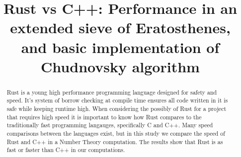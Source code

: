\documentclass[10pt]{IEEEtran}
\begin{document}
\title{Rust vs C++: Performance in an extended sieve of Eratosthenes, and basic implementation of Chudnovsky algorithm}
\author{
}
\date{}

\maketitle

\begin{abstract}
Rust is a young high performance programming language designed for safety and speed.
It's system of borrow checking at compile time ensures all code written in it is safe while keeping runtime high.
When considering the possibly of Rust for a project that requires high speed it is important to know how Rust compares to the traditionally fast programming langauges, specifically C and C++.
Many speed comparisons between the languages exist, but in this study we compare the speed of Rust and C++ in a Number Theory computation.
The results show that Rust is as fast or faster than C++ in our computations.
\end{abstract}
\end{document}
